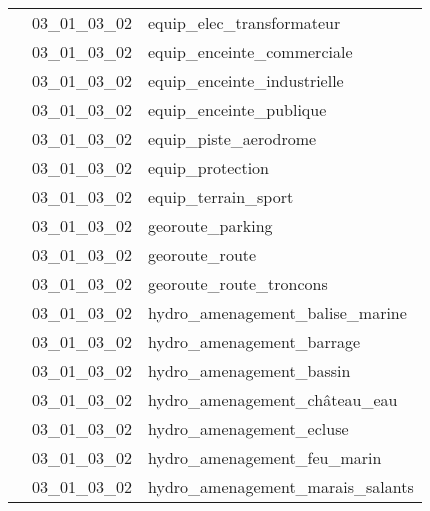 \documentclass[12pt,titlepage,oneside]{book}
\begin{document}
\begin{supertabular}{|p{10cm}|c|p{15cm}|}
                    & 03\_01\_03\_02 & equip\_elec\_transformateur\\


                    & 03\_01\_03\_02 & equip\_enceinte\_commerciale\\


                    & 03\_01\_03\_02 & equip\_enceinte\_industrielle\\


                    & 03\_01\_03\_02 & equip\_enceinte\_publique\\


                    & 03\_01\_03\_02 & equip\_piste\_aerodrome\\


                    & 03\_01\_03\_02 & equip\_protection\\


                    & 03\_01\_03\_02 & equip\_terrain\_sport\\


                    & 03\_01\_03\_02 & georoute\_parking\\


                    & 03\_01\_03\_02 & georoute\_route\\


                    & 03\_01\_03\_02 & georoute\_route\_troncons\\


                    & 03\_01\_03\_02 & hydro\_amenagement\_balise\_marine\\


                    & 03\_01\_03\_02 & hydro\_amenagement\_barrage\\


                    & 03\_01\_03\_02 & hydro\_amenagement\_bassin\\


                    & 03\_01\_03\_02 & hydro\_amenagement\_château\_eau\\


                    & 03\_01\_03\_02 & hydro\_amenagement\_ecluse\\


                    & 03\_01\_03\_02 & hydro\_amenagement\_feu\_marin\\


                    & 03\_01\_03\_02 & hydro\_amenagement\_marais\_salants\\



\end{supertabular}
\end{document}
